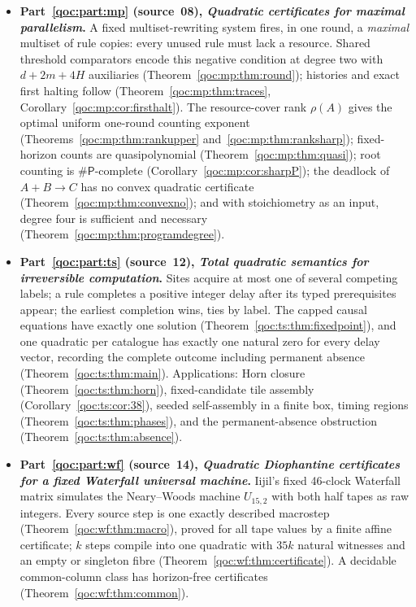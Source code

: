 \documentclass[11pt,letterpaper]{article}
\theoremstyle{definition}
\theoremstyle{remark}
\newcommand{\PP}{\mathsf{\#P}}
\begin{document}
\begin{itemize}
\item \textbf{Part~\ref{qoc:part:mp} (source~08), \emph{Quadratic certificates for maximal parallelism}.} A fixed multiset-rewriting system fires, in one round, a \emph{maximal} multiset of rule copies: every unused rule must lack a resource. Shared threshold comparators encode this negative condition at degree two with $d+2m+4H$ auxiliaries (Theorem~\ref{qoc:mp:thm:round}); histories and exact first halting follow (Theorem~\ref{qoc:mp:thm:traces}, Corollary~\ref{qoc:mp:cor:firsthalt}). The resource-cover rank $\rho(A)$ gives the optimal uniform one-round counting exponent (Theorems~\ref{qoc:mp:thm:rankupper} and~\ref{qoc:mp:thm:ranksharp}); fixed-horizon counts are quasipolynomial (Theorem~\ref{qoc:mp:thm:quasi}); root counting is $\PP$-complete (Corollary~\ref{qoc:mp:cor:sharpP}); the deadlock of $A+B\to C$ has no convex quadratic certificate (Theorem~\ref{qoc:mp:thm:convexno}); and with stoichiometry as an input, degree four is sufficient and necessary (Theorem~\ref{qoc:mp:thm:programdegree}).
\item \textbf{Part~\ref{qoc:part:ts} (source~12), \emph{Total quadratic semantics for irreversible computation}.} Sites acquire at most one of several competing labels; a rule completes a positive integer delay after its typed prerequisites appear; the earliest completion wins, ties by label. The capped causal equations have exactly one solution (Theorem~\ref{qoc:ts:thm:fixedpoint}), and one quadratic per catalogue has exactly one natural zero for every delay vector, recording the complete outcome including permanent absence (Theorem~\ref{qoc:ts:thm:main}). Applications: Horn closure (Theorem~\ref{qoc:ts:thm:horn}), fixed-candidate tile assembly (Corollary~\ref{qoc:ts:cor:38}), seeded self-assembly in a finite box, timing regions (Theorem~\ref{qoc:ts:thm:phases}), and the permanent-absence obstruction (Theorem~\ref{qoc:ts:thm:absence}).
\item \textbf{Part~\ref{qoc:part:wf} (source~14), \emph{Quadratic Diophantine certificates for a fixed Waterfall universal machine}.} Iijil's fixed 46-clock Waterfall matrix simulates the Neary--Woods machine $U_{15,2}$ with both half tapes as raw integers. Every source step is one exactly described macrostep (Theorem~\ref{qoc:wf:thm:macro}), proved for all tape values by a finite affine certificate; $k$ steps compile into one quadratic with $35k$ natural witnesses and an empty or singleton fibre (Theorem~\ref{qoc:wf:thm:certificate}). A decidable common-column class has horizon-free certificates (Theorem~\ref{qoc:wf:thm:common}).

\end{itemize}
\end{document}
